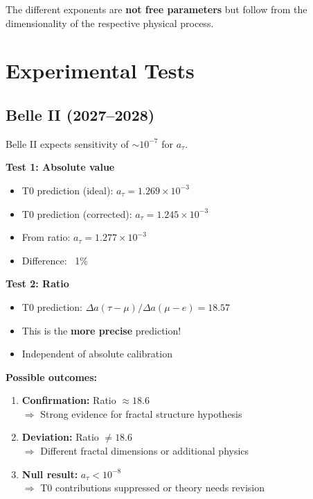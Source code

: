 	The different exponents are \textbf{not free parameters} but follow from the dimensionality of the respective physical process.
	
	\section{Experimental Tests}
	
	\subsection{Belle II (2027--2028)}
	
	Belle II expects sensitivity of $\sim 10^{-7}$ for $a_\tau$.
	
	\textbf{Test 1: Absolute value}
	\begin{itemize}
		\item T0 prediction (ideal): $a_\tau = 1.269 \times 10^{-3}$
		\item T0 prediction (corrected): $a_\tau = 1.245 \times 10^{-3}$
		\item From ratio: $a_\tau = 1.277 \times 10^{-3}$
		\item Difference: ~1\%
	\end{itemize}
	
	\textbf{Test 2: Ratio}
	\begin{itemize}
		\item T0 prediction: $\Delta a(\tau - \mu) / \Delta a(\mu - e) = 18.57$
		\item This is the \textbf{more precise} prediction!
		\item Independent of absolute calibration
	\end{itemize}
	
	\textbf{Possible outcomes:}
	\begin{enumerate}
		\item \textbf{Confirmation:} Ratio $\approx 18.6$ \\
		$\Rightarrow$ Strong evidence for fractal structure hypothesis
		
		\item \textbf{Deviation:} Ratio $\neq 18.6$ \\
		$\Rightarrow$ Different fractal dimensions or additional physics
		
		\item \textbf{Null result:} $a_\tau < 10^{-8}$ \\
		$\Rightarrow$ T0 contributions suppressed or theory needs revision
	\end{enumerate}
	
